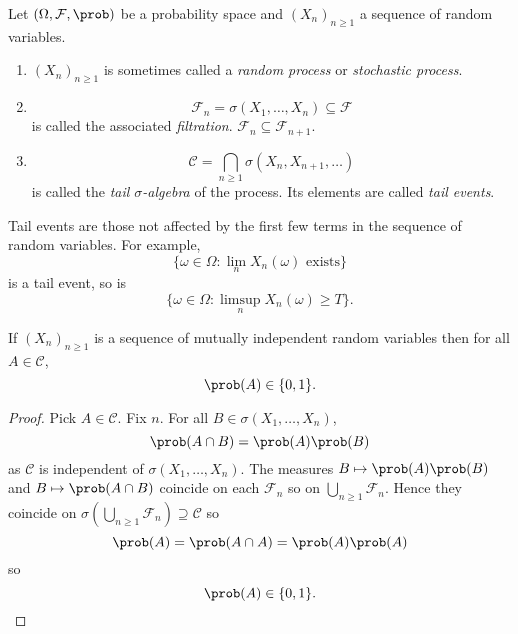 \documentclass[a4paper]{article}
\renewcommand{\P}{\prob} %
\begin{document}
\begin{definition}
  Let \((\Omega, \mathcal F, \P)\) be a probability space and \((X_n)_{n \geq 1}\) a sequence of random variables.
  \begin{enumerate}
  \item \((X_n)_{n \geq 1}\) is sometimes called a \emph{random process} or \emph{stochastic process}.
  \item
    \[
      \mathcal F_n = \sigma(X_1, \dots, X_n) \subseteq \mathcal F
    \]
    is called the associated \emph{filtration}. \(\mathcal F_n \subseteq \mathcal F_{n + 1}\).
  \item
    \[
      \mathcal C = \bigcap_{n \geq 1} \sigma(X_n, X_{n + 1}, \dots)
    \]
    is called the \emph{tail \(\sigma\)-algebra} of the process. Its elements are called \emph{tail events}.
  \end{enumerate}
\end{definition}

\begin{eg}
  Tail events are those not affected by the first few terms in the sequence of random variables. For example,
  \[
    \{\omega \in \Omega: \lim_n X_n(\omega) \text{ exists}\}
  \]
  is a tail event, so is
  \[
    \{\omega \in \Omega: \limsup_n X_n(\omega) \geq T\}.
  \]
\end{eg}

\begin{theorem}
  If \((X_n)_{n \geq 1}\) is a sequence of mutually independent random variables then for all \(A \in \mathcal C\),
  \[
    \P(A) \in \{0, 1\}.
  \]
\end{theorem}

\begin{proof}
  Pick \(A \in \mathcal C\). Fix \(n\). For all \(B \in \sigma(X_1, \dots, X_n)\),
  \[
    \P(A \cap B) = \P(A) \P(B)
  \]
  as \(\mathcal C\) is independent of \(\sigma(X_1, \dots, X_n)\). The measures \(B \mapsto \P(A) \P(B)\) and \(B \mapsto \P(A \cap B)\) coincide on each \(\mathcal F_n\) so on \(\bigcup_{n \geq 1} \mathcal F_n\). Hence they coincide on \(\sigma(\bigcup_{n \geq 1} \mathcal F_n) \supseteq \mathcal C\) so
  \[
    \P(A) = \P(A \cap A) = \P(A) \P(A)
  \]
  so
  \[
    \P(A) \in \{0, 1\}.
  \]
\end{proof}
\end{document}

